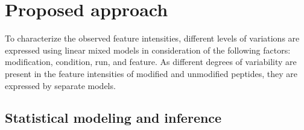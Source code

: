 \documentclass{mcp}
\begin{document}
%
%


\section{Proposed approach}
\label{sec:prop}

To characterize the observed feature intensities, different levels of variations are expressed using linear mixed models in consideration of the following factors: modification, condition, run, and feature. As different degrees of variability are present in the feature intensities of modified and unmodified peptides, they are expressed by separate models.


\subsection{Statistical modeling and inference}
\label{sec:model}
\end{document}
